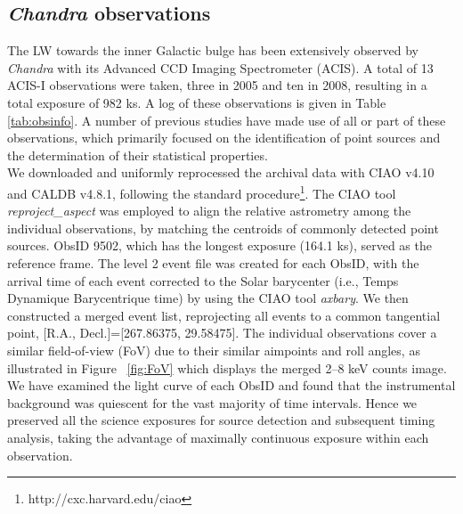 \documentclass[twoside,twocolumn]{aastex63}
\begin{document}
\subsection{{\it Chandra} observations} \label{subsec:xdata}
The LW towards the inner Galactic bulge has been extensively observed by {\it Chandra} with its Advanced CCD Imaging Spectrometer (ACIS).
A total of 13 ACIS-I observations were taken, three in 2005 and ten in 2008, resulting in a total exposure of 982 ks.
A log of these observations is given in Table \ref{tab:obsinfo}. 
A number of previous studies have made use of all or part of these observations, which primarily focused on the identification of point sources and the determination of their statistical properties.
\citep{2009Natur.458.1142R,2009ApJ...700.1702V,2009ApJ...706..223H,2011MNRAS.414..495R,2012MNRAS.427.1633H,2013ApJ...766...14M,2016MNRAS.462L.106W}
\\

We downloaded and uniformly reprocessed the archival data with CIAO v4.10 and CALDB v4.8.1, following the standard procedure\footnote{http://cxc.harvard.edu/ciao}.
The CIAO tool \emph{reproject\_aspect} was employed to align the relative astrometry among the individual observations, by matching the centroids of commonly detected point sources. ObsID 9502, which has the longest exposure (164.1 ks), served as the reference frame.
The level 2 event file was created for each ObsID, with the arrival time of each event corrected to the Solar barycenter (i.e., Temps Dynamique Barycentrique time) by using the CIAO tool \emph{axbary}.
We then constructed a merged event list, reprojecting all events to a common tangential point, [R.A., Decl.]=[267.86375, 29.58475].
The individual observations cover a similar field-of-view (FoV) due to their similar aimpoints and roll angles, as illustrated in Figure ~\ref{fig:FoV} which displays the merged 2--8 keV counts image.
We have examined the light curve of each ObsID and found that the instrumental background was quiescent for the vast majority of time intervals.
Hence we preserved all the science exposures for source detection and subsequent timing analysis, taking the advantage of maximally continuous exposure within each observation.  
\\
\end{document}
